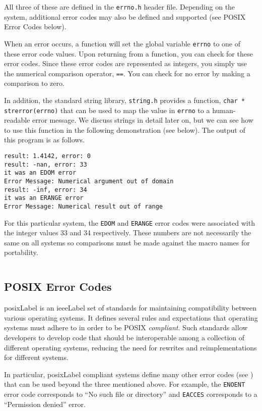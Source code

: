 All three of these are defined in the \texttt{errno.h} header file.
Depending on the system, additional error codes may also be defined
and supported (see POSIX Error Codes below).  

When an error occurs, a function will set the global variable 
\texttt{errno} to one of these error code values.  Upon returning 
from a function, you can check for these error codes.  Since these 
error codes are represented as integers, you simply use the numerical 
comparison operator, \texttt{==}.  You can check for no error
by making a comparison to zero.

In addition, the standard string library, \texttt{string.h} provides a function,
\texttt{char * strerror(errno)} that can be used to map the value in
\texttt{errno} to a human-readable error message.  We discuss
strings in detail later on, but we can see how to use this function in the
following demonstration (see below).  The output of this program is as follows.

\begin{verbatim}
result: 1.4142, error: 0
result: -nan, error: 33
it was an EDOM error
Error Message: Numerical argument out of domain
result: -inf, error: 34
it was an ERANGE error
Error Message: Numerical result out of range
\end{verbatim}

For this particular system, the \texttt{EDOM} and 
\texttt{ERANGE} error codes were associated with the
integer values 33 and 34 respectively.  These numbers are 
not necessarily the same on all systems so comparisons must 
be made against the macro names for portability.

\inputminted{c}{code/errorDemo.c}

\subsection{POSIX Error Codes}

\gls{posixLabel} is an \gls{ieeeLabel} set of standards for maintaining compatibility between
various operating systems.  It defines several rules and expectations
that operating systems must adhere to in order to be POSIX 
\emph{compliant}.  Such standards allow developers to develop 
code that should be interoperable among a collection of different
operating systems, reducing the need for rewrites and reimplementations
for different systems.

In particular, \gls{posixLabel} compliant systems define many other error 
codes (see \cite{posixErrno}) that can be used beyond the three
mentioned above.  For example, the \texttt{ENOENT} error
code corresponds to ``No such file or directory'' and \texttt{EACCES}
corresponds to a ``Permission denied'' error.

